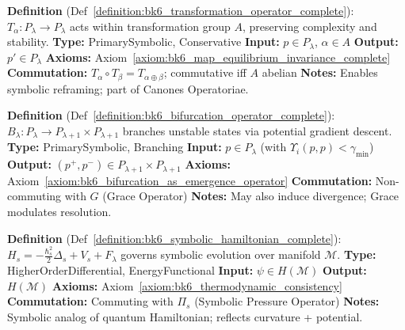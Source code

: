 \begin{description}[leftmargin=2.5cm, style=nextline]
\item[\textbf{Transformation Operator} \hfill \( T_{\alpha} \)] 
\label{dict:appA_transformation_operator}
\textbf{Definition} (Def~\ref{definition:bk6_transformation_operator_complete}): \( T_\alpha : P_\lambda \rightarrow P_\lambda \) acts within transformation group \( A \), preserving complexity and stability.
\textbf{Type:} PrimarySymbolic, Conservative
\textbf{Input:} \( p \in P_\lambda \), \( \alpha \in A \)
\textbf{Output:} \( p' \in P_\lambda \)
\textbf{Axioms:} Axiom~\ref{axiom:bk6_map_equilibrium_invariance_complete}
\textbf{Commutation:} \( T_\alpha \circ T_\beta = T_{\alpha \oplus \beta} \); commutative iff \( A \) abelian
\textbf{Notes:} Enables symbolic reframing; part of Canones Operatoriae.

\item[\textbf{Bifurcation Operator} \hfill \( B_{\lambda} \)] 
\label{dict:appA_bifurcation_operator}
\textbf{Definition} (Def~\ref{definition:bk6_bifurcation_operator_complete}): \( B_\lambda : P_\lambda \rightarrow P_{\lambda+1} \times P_{\lambda+1} \) branches unstable states via potential gradient descent.
\textbf{Type:} PrimarySymbolic, Branching
\textbf{Input:} \( p \in P_\lambda \) (with \( \Upsilon_i(p,p) < \gamma_{\min} \))
\textbf{Output:} \( (p^+, p^-) \in P_{\lambda+1} \times P_{\lambda+1} \)
\textbf{Axioms:} Axiom~\ref{axiom:bk6_bifurcation_as_emergence_operator}
\textbf{Commutation:} Non-commuting with \( G \) (Grace Operator)
\textbf{Notes:} May also induce divergence; Grace modulates resolution.

\item[\textbf{Symbolic Hamiltonian Operator} \hfill \( H_s \)] 
\label{dict:appA_symbolic_hamiltonian_operator}
\textbf{Definition} (Def~\ref{definition:bk6_symbolic_hamiltonian_complete}): \( H_s = - \frac{\hbar_s^2}{2} \Delta_s + V_s + F_\lambda \) governs symbolic evolution over manifold \( \mathcal{M} \).
\textbf{Type:} HigherOrderDifferential, EnergyFunctional
\textbf{Input:} \( \psi \in H(\mathcal{M}) \)
\textbf{Output:} \( H(\mathcal{M}) \)
\textbf{Axioms:} Axiom~\ref{axiom:bk6_thermodynamic_consistency}
\textbf{Commutation:} Commuting with \( \Pi_s \) (Symbolic Pressure Operator)
\textbf{Notes:} Symbolic analog of quantum Hamiltonian; reflects curvature + potential.


\end{description}
